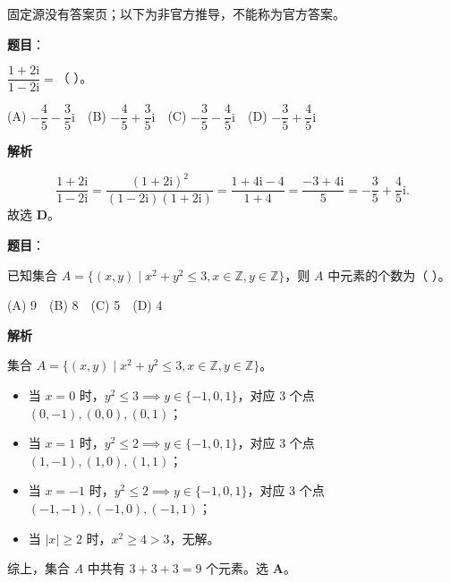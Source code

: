 
\begin{gktip}
固定源没有答案页；以下为非官方推导，不能称为官方答案。
\end{gktip}


\begin{answer}

\textbf{题目}：

$\dfrac{1+2\mathrm i}{1-2\mathrm i} =$（ ）。

(A) $-\dfrac45-\dfrac35\mathrm i$　(B) $-\dfrac45+\dfrac35\mathrm i$　(C) $-\dfrac35-\dfrac45\mathrm i$　(D) $-\dfrac35+\dfrac45\mathrm i$

\textbf{解析}

\nopagebreak[4]
\[\dfrac{1+2\mathrm i}{1-2\mathrm i} = \dfrac{(1+2\mathrm i)^2}{(1-2\mathrm i)(1+2\mathrm i)} = \dfrac{1+4\mathrm i-4}{1+4} = \dfrac{-3+4\mathrm i}{5} = -\dfrac35+\dfrac45\mathrm i.\]
故选 \textbf{D}。


\end{answer}
\begin{answer}

\textbf{题目}：

已知集合 $A=\{(x,y)\mid x^2+y^2\leqslant 3, x\in\mathbb Z, y\in\mathbb Z\}$，则 $A$ 中元素的个数为（ ）。

(A) 9　(B) 8　(C) 5　(D) 4

\textbf{解析}

集合 $A=\{(x,y)\mid x^2+y^2\leqslant 3, x\in\mathbb Z, y\in\mathbb Z\}$。
\begin{itemize}
\item 当 $x=0$ 时，$y^2\leqslant 3 \implies y\in\{-1,0,1\}$，对应 3 个点 $(0,-1), (0,0), (0,1)$；
\item 当 $x=1$ 时，$y^2\leqslant 2 \implies y\in\{-1,0,1\}$，对应 3 个点 $(1,-1), (1,0), (1,1)$；
\item 当 $x=-1$ 时，$y^2\leqslant 2 \implies y\in\{-1,0,1\}$，对应 3 个点 $(-1,-1), (-1,0), (-1,1)$；
\item 当 $|x|\geqslant 2$ 时，$x^2\geqslant 4 > 3$，无解。
\end{itemize}
综上，集合 $A$ 中共有 $3+3+3=9$ 个元素。选 \textbf{A}。


\end{answer}
